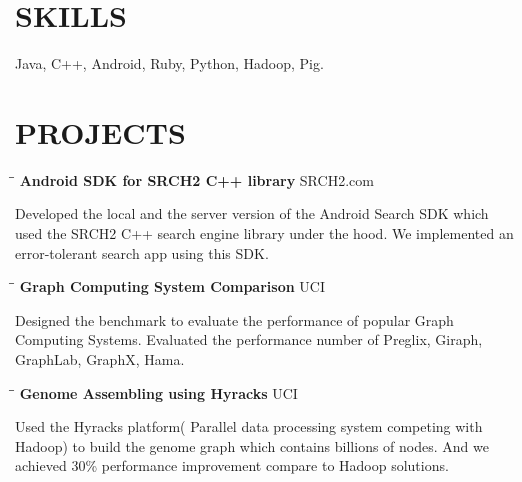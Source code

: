 \documentclass{res}
\begin{document}
\begin{resume}
\section{SKILLS}          
    Java, C++, Android, Ruby, Python, Hadoop, Pig.
 
\section{PROJECTS}
   \vspace{-0.1in}	
   \begin{tabbing}
   \hspace{2in}\= \hspace{3in}\= \kill %
    {\bf Android SDK for SRCH2 C++ library }\>  \>SRCH2.com\\
   \end{tabbing}\vspace{-30pt}      %
   Developed the local and the server version of the Android Search SDK which used the SRCH2 C++ search engine library under the hood. We implemented an error-tolerant search app using this SDK. 
   \vspace{-0.1in}	
   \begin{tabbing}
   \hspace{2in}\= \hspace{3in}\= \kill %
    {\bf Graph Computing System Comparison }\> \>UCI     \\
   \end{tabbing}\vspace{-30pt}      %
   Designed the benchmark to evaluate the performance of popular Graph Computing Systems. Evaluated the performance number of Preglix, Giraph, GraphLab, GraphX, Hama. 
%
   \vspace{-0.1in}	
   \begin{tabbing}
   \hspace{2in}\= \hspace{3in}\= \kill %
    {\bf Genome Assembling using Hyracks }\> \>UCI     \\
   \end{tabbing}\vspace{-30pt}      %
   Used the Hyracks platform( Parallel data processing system competing with Hadoop) to build the genome graph which contains billions of nodes. And we achieved 30\% performance improvement compare to Hadoop solutions.
%
   \vspace{-0.1in}	

\end{resume}
\end{document}
